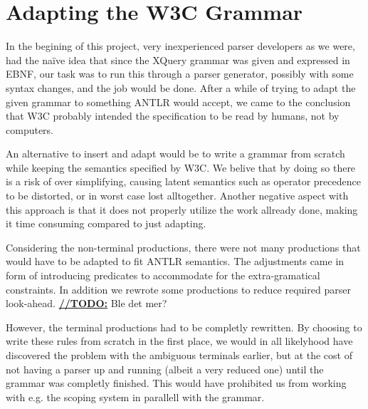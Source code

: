 \section{Adapting the W3C Grammar}
\label{sect:discussion:adaptW3C}

In the begining of this project, very inexperienced parser developers as we were, had the na\"{i}ve idea that since the XQuery grammar was given and expressed in EBNF, our task was to run this through a parser generator, possibly with some syntax changes, and the job would be done. After a while of trying to adapt the given grammar to something ANTLR would accept, we came to the conclusion that W3C probably intended the specification to be read by humans, not by computers.

An alternative to insert and adapt would be to write a grammar from scratch while keeping the semantics specified by W3C. We belive that by doing so there is a risk of over simplifying, causing latent semantics such as operator precedence to be distorted, or in worst case lost alltogether. Another negative aspect with this approach is that it does not properly utilize the work allready done, making it time consuming compared to just adapting.

Considering the non-terminal productions, there were not many productions that would have to be adapted to fit ANTLR semantics. The adjustments came in form of introducing predicates to accommodate for the extra-gramatical constraints. In addition we rewrote some productions to reduce required parser look-ahead. \underline{\textbf{\LARGE //TODO:}} Ble det mer?

However, the terminal productions had to be completly rewritten. By choosing to write these rules from scratch in the first place, we would in all likelyhood have discovered the problem with the ambiguous terminals earlier, but at the cost of not having a parser up and running (albeit a very reduced one) until the grammar was completly finished. This would have prohibited us from working with e.g. the scoping system in parallell with the grammar.
